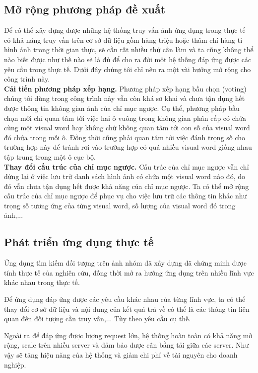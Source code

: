 \subsection{Mở rộng phương pháp đề xuất}
Để có thể xây dựng được những hệ thống truy vấn ảnh ứng dụng trong thực tế có khả năng truy vấn trên cơ sở dữ liệu gồm hàng triệu hoặc thâm chí hàng tỉ hình ảnh trong thời gian thực, sẽ cần rất nhiều thứ cần làm và ta cũng không thể nào biết được như thế nào sẽ là đủ để cho ra đời một hệ thống đáp ứng được các yêu cầu trong thực tế. Dưới đây chúng tôi chỉ nêu ra một vài hướng mở rộng cho công trình này.\\
\textbf{Cải tiến phương pháp xếp hạng.} Phương pháp xếp hạng bầu chọn (voting) chúng tôi dùng trong công trình này vẫn còn khá sơ khai và chưa tận dụng hết được thông tin không gian ảnh của chỉ mục ngược. Cụ thể, phương pháp bầu chọn mới chỉ quan tâm tới việc hai ô vuông trong không gian phân cấp có chứa cùng một visual word hay không chứ không quan tâm tới con số của visual word đó chứa trong mỗi ô. Đồng thời cũng phải quan tâm tới việc đánh trọng số cho trường hợp này để tránh rơi vào trường hợp có quá nhiều visual word giống nhau tập trung trong một ô cục bộ.\\
\textbf{Thay đổi cấu trúc của chỉ mục ngược.} Cấu trúc của chỉ mục ngược vẫn chỉ dừng lại ở việc lưu trữ danh sách hình ảnh có chứa một visual word nào đó, do đó vẫn chưa tận dụng hết được khả năng của chỉ mục ngược. Ta có thể mở rộng cấu trúc của chỉ mục ngược để phục vụ cho việc lưu trữ các thông tin khác như trọng số tương ứng của từng visual word, số lượng của visual word đó trong ảnh,...


\subsection{Phát triển ứng dụng thực tế}
Ứng dụng tìm kiếm đối tượng trên ảnh nhóm đã xây dựng đã chứng minh được tính thực tế của nghiên cứu, đồng thời mở ra hướng ứng dụng trên nhiều lĩnh vực khác nhau trong thực tế.

Để ứng dụng đáp ứng được các yêu cầu khác nhau của từng lĩnh vực, ta có thể thay đổi cơ sở dữ liệu và nội dung của kết quả trả về có thể là các thông tin liên quan đến đối tượng cần truy vấn,... Tùy theo yêu cầu cụ thế.

Ngoài ra để đáp ứng được lượng request lớn, hệ thống hoàn toàn có khả năng mở rộng, scale trên nhiều server và đảm bảo được cân bằng tải giữa các server. Như vậy sẽ tăng hiệu năng của hệ thống và giảm chi phí về tài nguyên cho doanh nghiệp.





